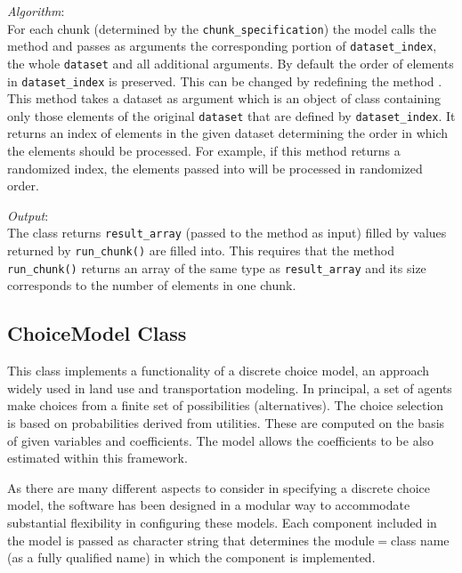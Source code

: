 {{\it Algorithm}:~\\[1mm]
%
For each chunk (determined by the \verb|chunk_specification|) the model calls
the method  and passes as arguments the corresponding portion
of \verb|dataset_index|, \datasetindex the whole \verb|dataset| \datasetindex and all additional
arguments. By default the order of elements in \verb|dataset_index| is
preserved. This can be changed by redefining the method
. This method takes a dataset \datasetindex as argument which is an
object of class  \datasetsubsetindex containing only those elements of the
original \verb|dataset| \datasetindex that are defined by \verb|dataset_index|. \datasetindex It returns
an index of elements in the given dataset \datasetindex determining the order in which the
elements should be processed. For example, if this method returns a randomized
index, the elements passed into  will be processed in
randomized order.


{\it Output}:~\\[1mm]
%
The class returns \verb|result_array| (passed to the method as input) filled
by values returned by \verb|run_chunk()| are filled into. This requires that
the method \verb|run_chunk()| returns an array of the same type as
\verb|result_array| and its size corresponds to the number of elements in one
chunk.

\subsection{ChoiceModel Class}
\label{sec:choice-model}
%
This class implements a functionality of a discrete choice model, an approach
widely used in land use and transportation modeling. In principal, a set of
agents make choices from a finite set of possibilities (alternatives). The
choice selection is based on probabilities derived from utilities. These are
computed on the basis of given variables \variablesindex and coefficients. \coefficientsindex The model allows
the coefficients \coefficientsindex to be also estimated within this framework.

As there are many different aspects to consider in specifying a discrete
choice model, the software has been designed in a modular way to accommodate
substantial flexibility in configuring these models. Each component included
in the model is passed as character string that determines the module$=$class
name (as a fully qualified name) in which the component is implemented.

}
